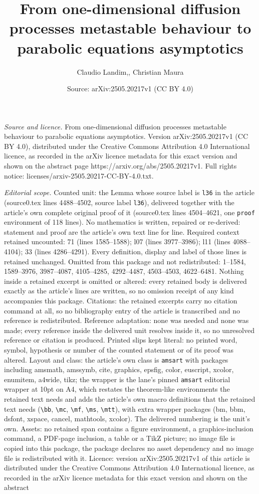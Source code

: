 \documentclass[10pt,a4paper]{amsart}
\title[From one-dimensional diffusion processes metastable behaviou]{From one-dimensional diffusion processes metastable behaviour to parabolic equations asymptotics}
\author{Claudio Landim,, Christian Maura}
\date{Source: arXiv:2505.20217v1 (CC BY 4.0)}
\begin{document}
\maketitle

\noindent\emph{Source and licence.} From one-dimensional diffusion processes metastable behaviour to parabolic equations asymptotics. Version arXiv:2505.20217v1 (CC BY 4.0), distributed under the Creative Commons Attribution 4.0 International licence, as recorded in the arXiv licence metadata for this exact version and shown on the abstract page https://arxiv.org/abs/2505.20217v1. Full rights notice: licenses/arxiv-2505.20217-CC-BY-4.0.txt.\par\smallskip

\noindent\textit{Editorial scope.} Counted unit: the Lemma whose source label is \texttt{l36} in the article (source0.tex lines 4488--4502, source label \texttt{l36}), delivered together with the article's own complete original proof of it (source0.tex lines 4504--4621, one \texttt{proof} environment of 118 lines). No mathematics is written, repaired or re-derived: statement and proof are the article's own text line for line. Required context retained uncounted: 71 (lines 1585--1588); l07 (lines 3977--3986); l11 (lines 4088--4104); 33 (lines 4286--4291). Every definition, display and label of those lines is retained unchanged. Omitted from this package and not redistributed: 1--1584, 1589--3976, 3987--4087, 4105--4285, 4292--4487, 4503--4503, 4622--6481. Nothing inside a retained excerpt is omitted or altered: every retained body is delivered exactly as the article's lines are written, so no omission receipt of any kind accompanies this package. Citations: the retained excerpts carry no citation command at all, so no bibliography entry of the article is transcribed and no reference is redistributed. Reference adaptation: none was needed and none was made; every reference inside the delivered unit resolves inside it, so no unresolved reference or citation is produced. Printed slips kept literal: no printed word, symbol, hypothesis or number of the counted statement or of its proof was altered. Layout and class: the article's own class is \texttt{amsart} with packages including amsmath, amssymb, cite, graphics, epsfig, color, euscript, xcolor, enumitem, a4wide, tikz; the wrapper is the lane's pinned \texttt{amsart} editorial wrapper at 10pt on A4, which restates the theorem-like environments the retained text needs and adds the article's own macro definitions that the retained text needs (\texttt{\textbackslash bb}, \texttt{\textbackslash mc}, \texttt{\textbackslash mf}, \texttt{\textbackslash ms}, \texttt{\textbackslash mtt}), with extra wrapper packages (bm, bbm, dsfont, xspace, cancel, mathtools, xcolor). The delivered numbering is the unit's own. Assets: no retained span contains a figure environment, a graphics-inclusion command, a PDF-page inclusion, a table or a TikZ picture; no image file is copied into this package, the package declares no asset dependency and no image file is redistributed with it. Licence: version arXiv:2505.20217v1 of this article is distributed under the Creative Commons Attribution 4.0 International licence, as recorded in the arXiv licence metadata for this exact version and shown on the abstract 
\end{document}
